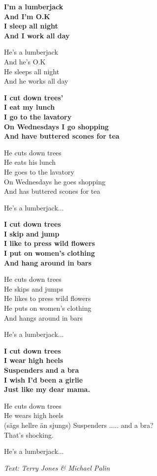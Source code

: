 \vspace{10pt}
\textbf{I'm a lumberjack\\
And I'm O.K\\
I sleep all night\\
And I work all day}\par
\vspace{10pt}
He's a lumberjack\\
And he's O.K\\
He sleeps all night\\
And he works all day\par
\vspace{10pt}
\textbf{I cut down trees'\\
I eat my lunch\\
I go to the lavatory\\
On Wednesdays I go shopping\\
And have buttered scones for tea}\par
\vspace{10pt}
He cuts down trees\\
He eats his lunch\\
He goes to the lavatory\\
On Wednesdays he goes shopping\\
And has buttered scones for tea\par
\vspace{10pt}
He's a lumberjack...\par
\vspace{10pt}
\textbf{I cut down trees\\
I skip and jump\\
I like to press wild flowers\\
I put on women's clothing\\
And hang around in bars}\par
\vspace{10pt}
He cuts down trees\\
He skips and jumps\\
He likes to press wild flowers\\
He puts on women's clothing\\
And hangs around in bars\par
\vspace{10pt}
He's a lumberjack...\par
\vspace{10pt}
\textbf{I cut down trees\\
I wear high heels\\
Suspenders and a bra\\
I wish I'd been a girlie\\
Just like my dear mama.}\par
\vspace{10pt}
He cuts down trees\\
He wears high heels\\
(sägs hellre än sjungs) Suspenders ..... and a bra?\\
That's shocking.\par
\vspace{10pt}
He's a lumberjack...
\par
\vspace{10pt}
{\footnotesize\textit{Text: Terry Jones \& Michael Palin}}
